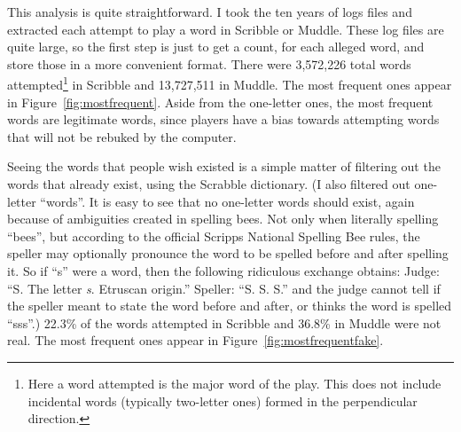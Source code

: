 \documentclass[twocolumn]{article}
\begin{document}
This analysis is quite straightforward. I took the ten years of logs
files and extracted each attempt to play a word in Scribble or Muddle.
These log files are quite large, so the first step is just to get a
count, for each alleged word, and store those in a more convenient
format. There were 3,572,226 total words attempted\footnote{Here a
  word attempted is the major word of the play. This does not include
  incidental words (typically two-letter ones) formed in the
  perpendicular direction.} in Scribble and 13,727,511 in Muddle. The
most frequent ones appear in Figure~\ref{fig:mostfrequent}. Aside from
the one-letter ones, the most frequent words are legitimate words,
since players have a bias towards attempting words that will not be
rebuked by the computer.

Seeing the words that people wish existed is a simple matter of
filtering out the words that already exist, using the Scrabble
dictionary. (I also filtered out one-letter ``words''. It is easy to
see that no one-letter words should exist, again because of
ambiguities created in spelling bees. Not only when literally spelling
``bees'', but according to the official Scripps National Spelling Bee
rules, the speller may optionally pronounce the word to be spelled
before and after spelling it. So if ``s'' were a word, then the
following ridiculous exchange obtains: Judge: ``S. The letter {\it s}.
Etruscan origin.'' Speller: ``S. S. S.'' and the judge cannot tell if
the speller meant to state the word before and after, or thinks the
word is spelled ``sss''.) 22.3\% of the words attempted in Scribble
and 36.8\% in Muddle were not real. The most frequent ones appear in
Figure~\ref{fig:mostfrequentfake}.
\end{document}
